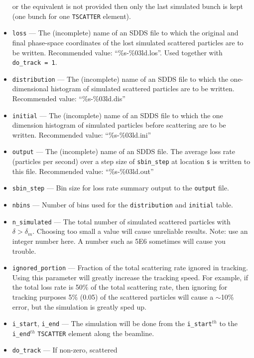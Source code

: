 \documentclass[11pt]{article}
\begin{document}
\begin{itemize}
   or the equivalent is not provided then only the last simulated bunch is kept (one bunch for one \verb|TSCATTER| element).
   \item \verb|loss| --- The (incomplete) name of an SDDS file to which the original and final 
   phase-space coordinates of the lost simulated scattered particles are to be written. 
   Recommended value: ``\%s-\%03ld.los''. Used together with \verb|do_track = 1|.
   \item \verb|distribution| --- The (incomplete) name of an SDDS file to which the one-dimensional
   histogram of simulated scattered particles are to be written. Recommended value: ``\%s-\%03ld.dis'' 
   \item \verb|initial| --- The (incomplete) name of an SDDS file to which the one dimension 
   histogram of simulated particles before scattering are to be written. Recommended value: ``\%s-\%03ld.ini''
   \item \verb|output| --- The (incomplete) name of an SDDS file. The average loss rate (particles per second) over a step size of 
   \verb|sbin_step| at location \verb|s| is written to this file. Recommended value: ``\%s-\%03ld.out'' 
   \item \verb|sbin_step| --- Bin size for loss rate summary output to the \verb|output| file.
   \item \verb|nbins| --- Number of bins used for the \verb|distribution| and \verb|initial| table.
   \item \verb|n_simulated| --- The total number of simulated scattered particles with $\delta>\delta_m$. Choosing too small
   a value will cause unreliable results. Note: use an integer number here. A number such as 5E6 sometimes will cause you trouble.
   \item \verb|ignored_portion| --- Fraction of the total scattering rate ignored in tracking. Using this parameter will greatly 
   increase the tracking speed. 
   For example, if
   the total loss rate is 50\% of the total scattering rate, then ignoring for tracking purposes 5\% (0.05) of the scattered particles
   will cause a $\sim$10\% error, but the simulation is greatly sped up.
   \item \verb|i_start|, \verb|i_end| --- The simulation will be done from the \verb|i_start|$^{th}$ to the \verb|i_end|$^{th}$
   \verb|TSCATTER| element along the beamline.    
   \item \verb|do_track| --- If non-zero, scattered

\end{itemize}
\end{document}
